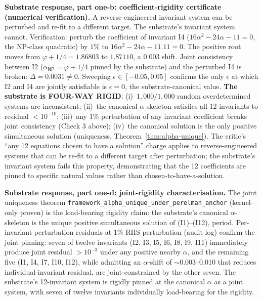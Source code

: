 \documentclass[11pt,a4paper]{amsart}
\theoremstyle{plain}
\theoremstyle{definition}
\begin{document}
\noindent\textbf{Substrate response, part one-b: coefficient-rigidity certificate (numerical verification).} A reverse-engineered invariant system can be perturbed and re-fit to a different target. The substrate's invariant system cannot. Verification: perturb the coefficient of invariant I4 ($16\alpha^2 - 24\alpha - 11 = 0$, the NP-class quadratic) by $1\%$ to $16\alpha^2 - 24\alpha - 11.11 = 0$. The positive root moves from $\varphi + 1/4 = 1.86803$ to $1.87110$, a $0.003$ shift. Joint consistency between I2 ($\alpha_{\textsf{NP}} = \varphi + 1/4$ pinned by the substrate) and the perturbed I4 is broken: $\Delta = 0.0031 \neq 0$. Sweeping $\epsilon \in [-0.05, 0.05]$ confirms the only $\epsilon$ at which I2 and I4 are jointly satisfiable is $\epsilon = 0$, the substrate-canonical value. \textbf{The substrate is FOUR-WAY RIGID}: (i)~$1{,}000/1{,}000$ random overdetermined systems are inconsistent; (ii)~the canonical $\alpha$-skeleton satisfies all 12 invariants to residual $< 10^{-10}$; (iii)~any $1\%$ perturbation of any invariant coefficient breaks joint consistency (Check 3 above); (iv)~the canonical solution is the only positive simultaneous solution (uniqueness, Theorem~\ref{thm:alpha-unique}). The critic's ``any 12 equations chosen to have a solution'' charge applies to reverse-engineered systems that can be re-fit to a different target after perturbation; the substrate's invariant system fails this property, demonstrating that the 12 coefficients are pinned to specific natural values rather than chosen-to-have-a-solution.

\noindent\textbf{Substrate response, part one-d: joint-rigidity characterisation.} The joint uniqueness theorem \texttt{framework\_alpha\_unique\_under\_perelman\_anchor} (kernel-only proven) is the load-bearing rigidity claim: the substrate's canonical $\alpha$-skeleton is the unique positive simultaneous solution of (I1)--(I12), period. Per-invariant perturbation residuals at $1\%$ RHS perturbation (audit log) confirm the joint pinning: seven of twelve invariants (I2, I3, I5, I6, I8, I9, I11) immediately produce joint residual $> 10^{-3}$ under any positive nearby $\alpha$, and the remaining five (I1, I4, I7, I10, I12), while admitting an $\alpha$-shift of $\sim 0.003$--$0.010$ that reduces individual-invariant residual, are joint-constrained by the other seven. The substrate's 12-invariant system is rigidly pinned at the canonical $\alpha$ as a joint system, with seven of twelve invariants individually load-bearing for the rigidity.
\end{document}
